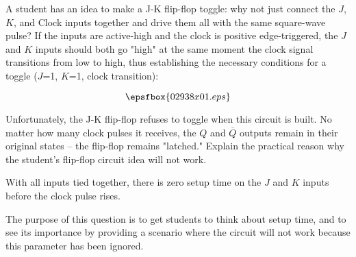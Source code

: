 

A student has an idea to make a J-K flip-flop toggle: why not just connect the $J$, $K$, and Clock inputs together and drive them all with the same square-wave pulse?  If the inputs are active-high and the clock is positive edge-triggered, the $J$ and $K$ inputs should both go "high" at the same moment the clock signal transitions from low to high, thus establishing the necessary conditions for a toggle ($J$=1, $K$=1, clock transition):

$$\epsfbox{02938x01.eps}$$

Unfortunately, the J-K flip-flop refuses to toggle when this circuit is built.  No matter how many clock pulses it receives, the $Q$ and $\overline{Q}$ outputs remain in their original states -- the flip-flop remains "latched."  Explain the practical reason why the student's flip-flop circuit idea will not work.







With all inputs tied together, there is zero setup time on the $J$ and $K$ inputs before the clock pulse rises.







The purpose of this question is to get students to think about setup time, and to see its importance by providing a scenario where the circuit will not work because this parameter has been ignored.




